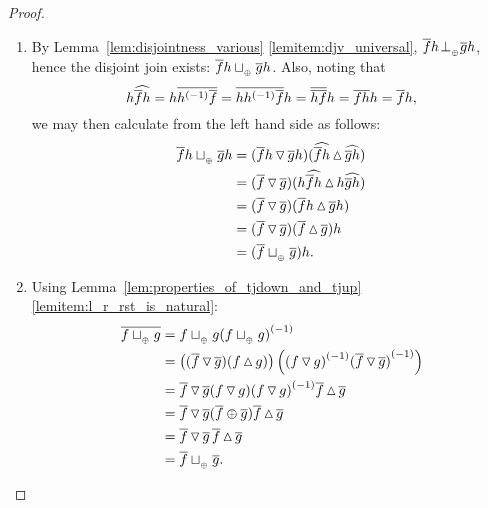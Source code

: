 \begin{proof}
  \prepprooflist
  \begin{enumerate}[{(}i{)}]
    \item By Lemma~\ref{lem:disjointness_various} \ref{lemitem:djv_universal},
    $\rst{f}h \tperp \rst{g} h$, hence the disjoint join exists: $\rst{f}h \tjoin \rst{g}h$.
    Also, noting that
      \[
        h \wrg{\rst{f} h} = h \rst{\inv{h}\rst{f}} = \rst{h \inv{h} \rst{f}} h
          = \rst{\rst{h}\rst{f}} h = \rst{f} \rst{h}h = \rst{f} h,
      \]
      we may then calculate from the left hand side as follows:
      \begin{align*}
        \rst{f}h \tjoin \rst{g}h
          & = (\rst{f}h \tjdown \rst{g} h) (\wrg{\rst{f}h}\tjup\wrg{\rst{g} h})\\
          & = (\rst{f} \tjdown \rst{g} ) (h\wrg{\rst{f}h}\tjup h\wrg{\rst{g} h})\\
          & = (\rst{f} \tjdown \rst{g} ) (\rst{f}h\tjup \rst{g} h)\\
          & = (\rst{f} \tjdown \rst{g} ) (\rst{f}\tjup \rst{g} )h\\
          & = (\rst{f} \tjoin \rst{g} ) h.
      \end{align*}
    \item
    Using Lemma~\ref{lem:properties_of_tjdown_and_tjup} \ref{lemitem:l_r_rst_is_natural}:
    \begin{align*}
      \rst{f\tjoin g} & = f \tjoin g \inv{(f\tjoin g)} \\
      & = \left((\rst{f} \tjdown \rst{g})(f\tjup g)\right)
             \left(\inv{(f\tjdown g)} \inv{(\rst{f}\tjdown \rst{g})}\right)\\
      & = \rst{f}\tjdown\rst{g}(f\tjdown g) \inv{(f\tjdown g)} \rst{f}\tjup \rst{g}\\
      & = \rst{f}\tjdown\rst{g}(\rst{f}\+ \rst{g})\rst{f}\tjup \rst{g}\\
      & = \rst{f}\tjdown\rst{g}\,\rst{f}\tjup \rst{g}\\
      & = \rst{f}\tjoin\rst{g}.
    \end{align*}
  \end{enumerate}
\end{proof}


